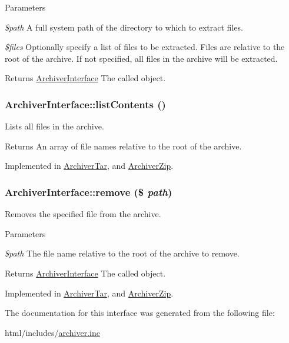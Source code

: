 \begin{DoxyParams}{Parameters}
\item[{\em \$path}]A full system path of the directory to which to extract files. \item[{\em \$files}]Optionally specify a list of files to be extracted. Files are relative to the root of the archive. If not specified, all files in the archive will be extracted.\end{DoxyParams}
\begin{DoxyReturn}{Returns}
\hyperlink{interfaceArchiverInterface}{ArchiverInterface} The called object. 
\end{DoxyReturn}
\hypertarget{interfaceArchiverInterface_a0be527152061af9bfd22a525fc29d78d}{
\subsubsection[{listContents}]{\setlength{\rightskip}{0pt plus 5cm}ArchiverInterface::listContents ()}}
\label{interfaceArchiverInterface_a0be527152061af9bfd22a525fc29d78d}
Lists all files in the archive.

\begin{DoxyReturn}{Returns}
An array of file names relative to the root of the archive. 
\end{DoxyReturn}


Implemented in \hyperlink{classArchiverTar_a6293cb8fd0519ae617a789ea08799914}{ArchiverTar}, and \hyperlink{classArchiverZip_ad4d1065b4609b607195c87d432f440f7}{ArchiverZip}.\hypertarget{interfaceArchiverInterface_adf87dd4d31b2af7c9a90617436683edc}{
\subsubsection[{remove}]{\setlength{\rightskip}{0pt plus 5cm}ArchiverInterface::remove (\$ {\em path})}}
\label{interfaceArchiverInterface_adf87dd4d31b2af7c9a90617436683edc}
Removes the specified file from the archive.


\begin{DoxyParams}{Parameters}
\item[{\em \$path}]The file name relative to the root of the archive to remove.\end{DoxyParams}
\begin{DoxyReturn}{Returns}
\hyperlink{interfaceArchiverInterface}{ArchiverInterface} The called object. 
\end{DoxyReturn}


Implemented in \hyperlink{classArchiverTar_a7e3e6cc10110d77b1411074f7e65c2e0}{ArchiverTar}, and \hyperlink{classArchiverZip_af19c19d199c96acfd65a08ccfb7ea406}{ArchiverZip}.

The documentation for this interface was generated from the following file:\begin{DoxyCompactItemize}
\item 
html/includes/\hyperlink{archiver_8inc}{archiver.inc}\end{DoxyCompactItemize}

